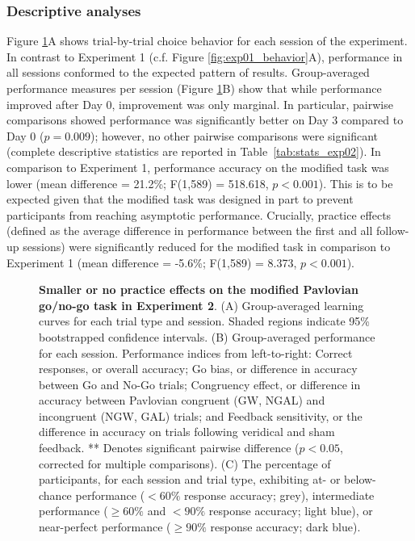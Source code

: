 \documentclass[a4paper,12pt]{article}
\begin{document}
\begin{refsection}[main]
\subsubsection*{Descriptive analyses}

Figure \ref{fig:exp02_behavior}A shows trial-by-trial choice behavior for each session of the experiment. In contrast to Experiment 1 (c.f. Figure \ref{fig:exp01_behavior}A), performance in all sessions conformed to the expected pattern of results. Group-averaged performance measures per session (Figure \ref{fig:exp02_behavior}B) show that while performance improved after Day 0, improvement was only marginal. In particular, pairwise comparisons showed performance was significantly better on Day 3 compared to Day 0 ($p = 0.009$); however, no other pairwise comparisons were significant (complete descriptive statistics are reported in Table~\ref{tab:stats_exp02}). In comparison to Experiment 1, performance accuracy on the modified task was lower (mean difference = 21.2\%; F(1,589) = 518.618, $p < 0.001$). This is to be expected given that the modified task was designed in part to prevent participants from reaching asymptotic performance. Crucially, practice effects (defined as the average difference in performance between the first and all follow-up sessions) were significantly reduced for the modified task in comparison to Experiment 1 (mean difference = -5.6\%; F(1,589) = 8.373, $p < 0.001$). 

\begin{figure}[hpt]
    \centerline{}
    \caption{{\bf Smaller or no practice effects on the modified Pavlovian go/no-go task in Experiment 2}. (A) Group-averaged learning curves for each trial type and session. Shaded regions indicate 95\% bootstrapped confidence intervals. (B) Group-averaged performance for each session. Performance indices from left-to-right: Correct responses, or overall accuracy; Go bias, or difference in accuracy between Go and No-Go trials; Congruency effect, or difference in accuracy between Pavlovian congruent (GW, NGAL) and incongruent (NGW, GAL) trials; and Feedback sensitivity, or the difference in accuracy on trials following veridical and sham feedback. ** Denotes significant pairwise difference ($p < 0.05$, corrected for multiple comparisons). (C) The percentage of participants, for each session and trial type, exhibiting at- or below-chance performance ($< 60\%$ response accuracy; grey), intermediate performance ($\geq 60\%$  and $< 90\%$ response accuracy; light blue), or near-perfect performance ($\geq 90\%$ response accuracy; dark blue).}
    \label{fig:exp02_behavior}
\end{figure}


\end{refsection}
\end{document}
